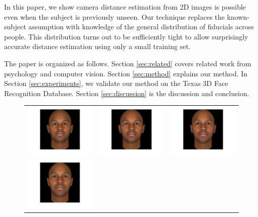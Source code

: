 \documentclass[runningheads]{llncs}
\begin{document}
In this paper, we show camera distance estimation from 2D images is possible even when the subject is previously unseen.
Our technique replaces the known-subject assumption with knowledge of the general distribution of fiducials across people.
This distribution turns out to be sufficiently tight to allow surprisingly accurate distance estimation using only a small training set.

The paper is organized as follows.
Section \ref{sec:related} covers related work from psychology and computer vision.
Section \ref{sec:method} explains our method.
In Section \ref{sec:experiments}, we validate our method on the Texas 3D Face Recognition Database.
Section \ref{sec:discussion} is the discussion and conclusion.

\begin{figure}[ht!]
\centering
\begin{tabular}{ccc}
\includegraphics[width=.33\linewidth]{resources/figures/extracted_fiducial_0006.png} &
\includegraphics[width=.33\linewidth]{resources/figures/extracted_fiducial_0008.png} &
\includegraphics[width=.33\linewidth]{resources/figures/extracted_fiducial_0001.png} \\
\includegraphics[width=.33\linewidth]{resources/figures/extracted_fiducial_0002.png} &

\end{tabular}
\end{figure}
\end{document}
